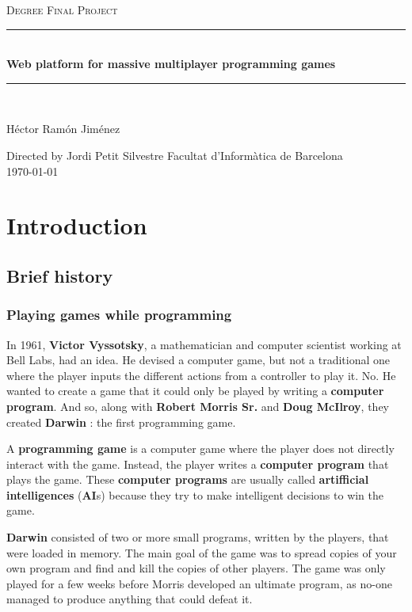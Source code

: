 \documentclass[a4paper,11pt,titlepage,abstract,numbers=noenddot,automark,mnsy,intlimits,rgb,dvipsnames]{report}
\begin{document}
\begin{titlepage}
\begin{center}
\textsc{\Large Degree Final Project}
\\[1.5cm]
\rule{\linewidth}{0.5mm}
\\[0.4cm]
{\huge
\bfseries
Web platform for massive multiplayer programming games
\\[0.4cm]
}
\rule{\linewidth}{0.5mm}
\\[2.5cm]
\begin{center}
\large
Héctor Ramón Jiménez
\end{center}
Directed by Jordi Petit Silvestre
\vfill
{\large
Facultat d'Informàtica de Barcelona
}
\\[0.5cm]
{\large
\today
}
\end{center}
\end{titlepage}
\clearpage
\tableofcontents
\clearpage
\chapter{Introduction}
\section{Brief history}
\subsection{Playing games while programming}
In 1961, \textbf{Victor Vyssotsky}, a mathematician and computer scientist working at Bell Labs, had an idea. He devised
a computer game, but not a traditional one where the player inputs the different actions from a controller to play it.
No. He wanted to create a game that it could only be played by writing a \textbf{computer program}. And so, along with \textbf{Robert
Morris Sr.} and \textbf{Doug McIlroy}, they created \textbf{Darwin} \cite{darwin}: the first programming game.

A \textbf{programming game} is a computer game where the player does not directly interact with the game. Instead, the
player writes a \textbf{computer program} that plays the game. These \textbf{computer programs} are usually called \textbf{artifficial
intelligences} (\textbf{AI}s) because they try to make intelligent decisions to win the game.

\textbf{Darwin} consisted of two or more small programs, written by the players, that were loaded in memory. The main goal
of the game was to spread copies of your own program and find and kill the copies of other players. The game was only
played for a few weeks before Morris developed an ultimate program, as no-one managed to produce anything that could
defeat it.
\end{document}
